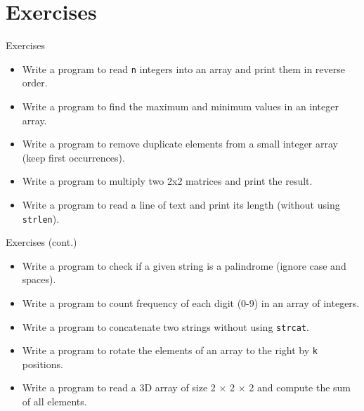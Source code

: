 \documentclass[12pt, aspectratio=169]{beamer}
\begin{document}
    \section{Exercises}


    \begin{frame}{Exercises}
        \begin{itemize}
            \item Write a program to read \texttt{n} integers into an array and print them in reverse order.
            \item Write a program to find the maximum and minimum values in an integer array.
            \item Write a program to remove duplicate elements from a small integer array (keep first occurrences).
            \item Write a program to multiply two 2x2 matrices and print the result.
            \item Write a program to read a line of text and print its length (without using \texttt{strlen}).
        \end{itemize}
    \end{frame}


    \begin{frame}{Exercises (cont.)}
        \begin{itemize}
            \item Write a program to check if a given string is a palindrome (ignore case and spaces).
            \item Write a program to count frequency of each digit (0-9) in an array of integers.
            \item Write a program to concatenate two strings without using \texttt{strcat}.
            \item Write a program to rotate the elements of an array to the right by \texttt{k} positions.
            \item Write a program to read a 3D array of size 2 × 2 × 2 and compute the sum of all elements.
        \end{itemize}
    \end{frame}
\end{document}
